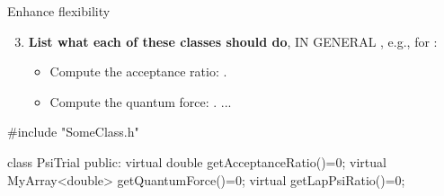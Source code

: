  
 
\begin{frame}[fragile]
  \begin{alertblock}{Enhance flexibility}
      \begin{enumerate}\setcounter{enumi}{2}
       
       \item  {\textbf{List what each of these classes should do}}, IN GENERAL \color{blue}{(member functions)}, e.g., for {}:
          \begin{itemize}
           \item Compute the acceptance ratio: .
           
           \item Compute the quantum force: .
           ...
          \end{itemize}

          
      \end{enumerate}
    \end{alertblock}
    
      \begin{scriptsize}
    \begin{C++}
    
      #include "SomeClass.h"
      
      class PsiTrial{
        public:
          virtual double getAcceptanceRatio()=0;
          virtual MyArray<double> getQuantumForce()=0;
          virtual getLapPsiRatio()=0;
      }
    \end{C++}
  \end{scriptsize}

\end{frame}



